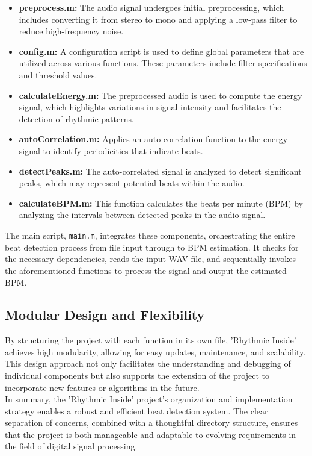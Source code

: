 \begin{itemize}
    \item \textbf{preprocess.m:} The audio signal undergoes initial preprocessing, which includes converting it from stereo to mono and applying a low-pass filter to reduce high-frequency noise.
    \item \textbf{config.m:} A configuration script is used to define global parameters that are utilized across various functions. These parameters include filter specifications and threshold values.
    \item \textbf{calculateEnergy.m:} The preprocessed audio is used to compute the energy signal, which highlights variations in signal intensity and facilitates the detection of rhythmic patterns.
    \item \textbf{autoCorrelation.m:} Applies an auto-correlation function to the energy signal to identify periodicities that indicate beats.
    \item \textbf{detectPeaks.m:} The auto-correlated signal is analyzed to detect significant peaks, which may represent potential beats within the audio.
    \item \textbf{calculateBPM.m:} This function calculates the beats per minute (BPM) by analyzing the intervals between detected peaks in the audio signal.
\end{itemize}

The main script, \texttt{main.m}, integrates these components, orchestrating the entire beat detection process from file input through to BPM estimation. It checks for the necessary dependencies, reads the input WAV file, and sequentially invokes the aforementioned functions to process the signal and output the estimated BPM.

\subsection{Modular Design and Flexibility}
By structuring the project with each function in its own file, 'Rhythmic Inside' achieves high modularity, allowing for easy updates, maintenance, and scalability. This design approach not only facilitates the understanding and debugging of individual components but also supports the extension of the project to incorporate new features or algorithms in the future. \\

In summary, the 'Rhythmic Inside' project's organization and implementation strategy enables a robust and efficient beat detection system. The clear separation of concerns, combined with a thoughtful directory structure, ensures that the project is both manageable and adaptable to evolving requirements in the field of digital signal processing.
